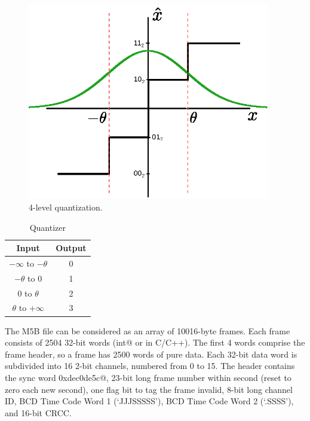 \documentclass[letterpaper,twoside,12pt]{article}
\begin{document}
\begin{figure}[ht!]
  \begin{center}
  \includegraphics[width=25pc]{fig_4_Level_Quantization_Pattern_impr.eps}
  \caption{\small 4-level quantization.}
  \label{quant4lvl}
  \end{center}
\end{figure}


\begin{table}[ht!]
  \begin{center}
    \caption{Quantizer}
    \label{quant_io}
    \begin{tabular}{c|c}
      \textbf{Input} & \textbf{Output} \\
      \hline
      $-\infty$ to $-\theta$ & 0 \\
      $-\theta$ to 0         & 1 \\
      0 to $\theta$          & 2 \\
      $\theta$ to $+\infty$  & 3 \\
    \end{tabular}
  \end{center}
\end{table}


The M5B file can be considered as an array of 10016-byte frames. Each frame consists of 2504 32-bit words (\verb@unsigned int@ or  \verb@uint@ in C/C++). The first 4 words comprise the frame header, so a frame has 2500 words of pure data. Each 32-bit data word is subdivided into 16 2-bit channels, numbered from 0 to 15. The header contains the sync word \verb@0xdec0de5c@, 23-bit long frame number within second (reset to zero each new second), one flag bit to tag the frame invalid, 8-bit long channel ID, BCD Time Code Word 1 (‘JJJSSSSS’), BCD Time Code Word 2 (‘.SSSS’), and  16-bit CRCC.
\end{document}
